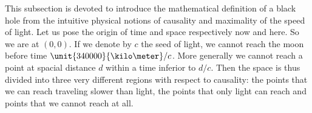 This subsection is devoted to introduce the mathematical definition of a black hole from the intuitive physical notions of causality and maximality of the speed of light. Let us pose the origin of time and space respectively now and here. So we are at $(0,0)$. If we denote by $c$ the seed of light, we cannot reach the moon before time $\unit{340000}{\kilo\meter}/c$. More generally we cannot reach a point at spacial distance $d$ within a time inferior to $d/c$. Then the space is thus divided into three very different regions with respect to causality: the points that we can reach traveling slower than light, the points that only light can reach and points that we cannot reach at all.


